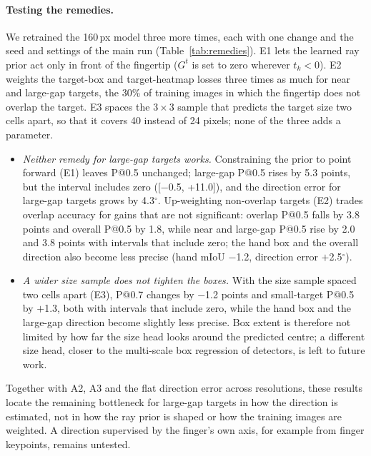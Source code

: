 \paragraph{Testing the remedies.} We retrained the 160\,px model three more times, each with one change and the seed and settings of the main run (Table~\ref{tab:remedies}). E1 lets the learned ray prior act only in front of the fingertip ($G^t$ is set to zero wherever $t_k<0$). E2 weights the target-box and target-heatmap losses three times as much for near and large-gap targets, the 30\% of training images in which the fingertip does not overlap the target. E3 spaces the $3\times3$ sample that predicts the target size two cells apart, so that it covers 40 instead of 24 pixels; none of the three adds a parameter.
\begin{itemize}
\item \emph{Neither remedy for large-gap targets works.} Constraining the prior to point forward (E1) leaves P@0.5 unchanged; large-gap P@0.5 rises by 5.3 points, but the interval includes zero ([$-$0.5, +11.0]), and the direction error for large-gap targets grows by 4.3$^\circ$. Up-weighting non-overlap targets (E2) trades overlap accuracy for gains that are not significant: overlap P@0.5 falls by 3.8 points and overall P@0.5 by 1.8, while near and large-gap P@0.5 rise by 2.0 and 3.8 points with intervals that include zero; the hand box and the overall direction also become less precise (hand mIoU $-$1.2, direction error $+$2.5$^\circ$).
\item \emph{A wider size sample does not tighten the boxes.} With the size sample spaced two cells apart (E3), P@0.7 changes by $-$1.2 points and small-target P@0.5 by $+$1.3, both with intervals that include zero, while the hand box and the large-gap direction become slightly less precise. Box extent is therefore not limited by how far the size head looks around the predicted centre; a different size head, closer to the multi-scale box regression of detectors, is left to future work.
\end{itemize}
Together with A2, A3 and the flat direction error across resolutions, these results locate the remaining bottleneck for large-gap targets in how the direction is estimated, not in how the ray prior is shaped or how the training images are weighted. A direction supervised by the finger's own axis, for example from finger keypoints, remains untested.

